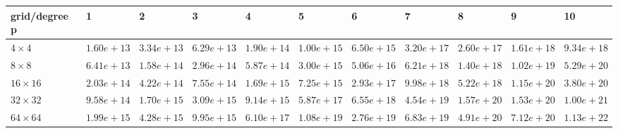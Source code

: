 \begin{tabular}{lllllllllll}
\hline
 grid/degree p   & 1          & 2          & 3          & 4          & 5          & 6          & 7          & 8          & 9          & 10         \\
\hline
 $4 \times 4$    & $1.60e+13$ & $3.34e+13$ & $6.29e+13$ & $1.90e+14$ & $1.00e+15$ & $6.50e+15$ & $3.20e+17$ & $2.60e+17$ & $1.61e+18$ & $9.34e+18$ \\
 $8 \times 8$    & $6.41e+13$ & $1.58e+14$ & $2.96e+14$ & $5.87e+14$ & $3.00e+15$ & $5.06e+16$ & $6.21e+18$ & $1.40e+18$ & $1.02e+19$ & $5.29e+20$ \\
 $16 \times 16$  & $2.03e+14$ & $4.22e+14$ & $7.55e+14$ & $1.69e+15$ & $7.25e+15$ & $2.93e+17$ & $9.98e+18$ & $5.22e+18$ & $1.15e+20$ & $3.80e+20$ \\
 $32 \times 32$  & $9.58e+14$ & $1.70e+15$ & $3.09e+15$ & $9.14e+15$ & $5.87e+17$ & $6.55e+18$ & $4.54e+19$ & $1.57e+20$ & $1.53e+20$ & $1.00e+21$ \\
 $64 \times 64$  & $1.99e+15$ & $4.28e+15$ & $9.95e+15$ & $6.10e+17$ & $1.08e+19$ & $2.76e+19$ & $6.83e+19$ & $4.91e+20$ & $7.12e+20$ & $1.13e+22$ \\
\hline
\end{tabular}